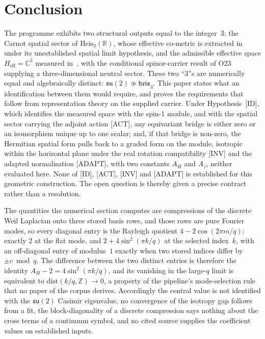 \documentclass[11pt,a4paper]{article}
\newcommand{\Heis}{\mathrm{Heis}_3}
\newcommand{\Heff}{H_{\mathrm{eff}}}
\newcommand{\su}{\mathfrak{su}}
\newcommand{\heis}{\mathfrak{heis}_3}
\begin{document}
  \section{Conclusion}

  The programme exhibits two structural outputs equal to the integer~$3$: the Carnot spatial sector
  of $\Heis(\mathbb{R})$, whose effective co-metric is extracted in~\cite{Beau2026q5b} under its
  unestablished spatial limit hypothesis, and the admissible effective space
  $\Heff = \mathbb{C}^3$ measured in~\cite{Beau2026a32}, with the conditional spinor-carrier result
  of O23~\cite{Beau2026a27} supplying a three-dimensional neutral sector.
  These two ``3''s are numerically equal and algebraically distinct: $\su(2) \not\simeq \heis$.
  This paper states what an identification between them would require, and proves the requirements
  that follow from representation theory on the supplied carrier.
  Under Hypothesis~[ID], which identifies the measured space with the spin-$1$ module, and with the
  spatial sector carrying the adjoint action [ACT], any equivariant bridge is either zero or an
  isomorphism unique up to one scalar; and, if that bridge is non-zero, the Hermitian spatial form
  pulls back to a graded form on the module, isotropic within the horizontal plane under the
  real rotation compatibility [INV] and the adapted normalisation [ADAPT], with two constants
  $A_H$ and $A_z$, neither evaluated here.
  None of [ID], [ACT], [INV] and [ADAPT] is established for this geometric construction.
  The open question is thereby given a precise contract rather than a resolution.

  The quantities the numerical section computes are compressions of the discrete Weil Laplacian onto three stored
  basis rows, and those rows are pure Fourier modes, so every diagonal entry is the Rayleigh quotient
  $4 - 2\cos(2\pi m/q)$: exactly $2$ at the flat mode, and $2 + 4\sin^2(\pi k/q)$ at the selected
  index~$k$, with an off-diagonal entry of modulus~$1$ exactly when two stored indices differ by
  $\pm c \bmod q$.
  The difference between the two distinct entries is therefore the identity
  $A_H - 2 = 4\sin^2(\pi k/q)$, and its vanishing in the large-$q$ limit is equivalent to
  $\mathrm{dist}(k/q, \mathbb{Z}) \to 0$, a property of the pipeline's mode-selection rule that no
  paper of the corpus derives.
  Accordingly the central value is not identified with the $\su(2)$ Casimir eigenvalue, no
  convergence of the isotropy gap follows from a fit, the block-diagonality of a discrete
  compression says nothing about the cross terms of a continuum symbol, and no cited source
  supplies the coefficient values on established inputs.
\end{document}
